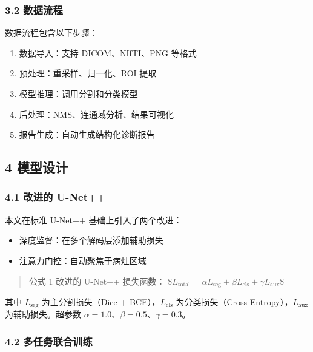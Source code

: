\documentclass{harryopo-paper}
\begin{document}
\subsubsection*{3.2 数据流程}

数据流程包含以下步骤：

\begin{enumerate}
  \item {\fzht 数据导入}：支持 DICOM、NIfTI、PNG 等格式
  \item {\fzht 预处理}：重采样、归一化、ROI 提取
  \item {\fzht 模型推理}：调用分割和分类模型
  \item {\fzht 后处理}：NMS、连通域分析、结果可视化
  \item {\fzht 报告生成}：自动生成结构化诊断报告
\end{enumerate}

\subsection*{4 模型设计}

\subsubsection*{4.1 改进的 U-Net++}

本文在标准 U-Net++ 基础上引入了两个改进：

\begin{itemize}
  \item {\fzht 深度监督}：在多个解码层添加辅助损失
  \item {\fzht 注意力门控}：自动聚焦于病灶区域
\end{itemize}

\begin{quote}
{\fzht 公式 1} 改进的 U-Net++ 损失函数：
\$$L_{\text{total}} = \alpha L_{\text{seg}} + \beta L_{\text{cls}} + \gamma L_{\text{aux}}$\$
\end{quote}

其中 $L_{\text{seg}}$ 为主分割损失（Dice + BCE），$L_{\text{cls}}$ 为分类损失（Cross Entropy），$L_{\text{aux}}$ 为辅助损失。超参数 $\alpha = 1.0$、$\beta = 0.5$、$\gamma = 0.3$。

\subsubsection*{4.2 多任务联合训练}
\end{document}
